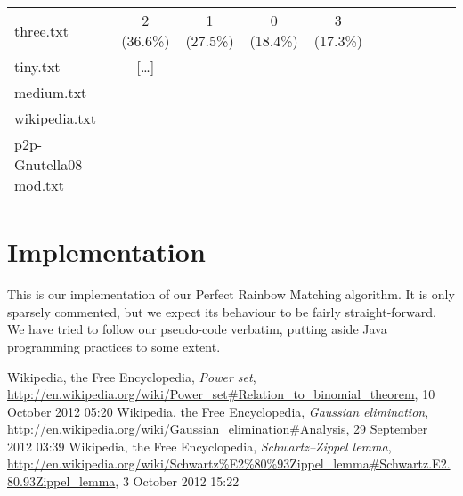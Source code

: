 \documentclass{tufte-handout}
\begin{document}
\medskip
\begin{fullwidth}
\small
\begin{tabular}{lcccccccccc}
three.txt & 2 (36.6\%) & 1 (27.5\%) & 0 (18.4\%) & 3 (17.3\%) \\
tiny.txt & [\ldots] &\\
medium.txt &\\
wikipedia.txt & \\
p2p-Gnutella08-mod.txt &
\end{tabular}
\end{fullwidth}

\appendix

\section{Implementation}
This is our implementation of our Perfect Rainbow Matching algorithm. It is only sparsely commented, but we expect its behaviour to be fairly straight-forward. We have tried to follow our pseudo-code verbatim, putting aside Java programming practices to some extent.

\begin{thebibliography}{9}
 Wikipedia, the Free Encyclopedia, \emph{Power set},  \url{http://en.wikipedia.org/wiki/Power_set#Relation_to_binomial_theorem}, 10 October 2012 05:20
 Wikipedia, the Free Encyclopedia, \emph{Gaussian elimination}, \url{http://en.wikipedia.org/wiki/Gaussian_elimination#Analysis}, 29 September 2012 03:39
 Wikipedia, the Free Encyclopedia, \emph{Schwartz–Zippel lemma}, \url{http://en.wikipedia.org/wiki/Schwartz\%E2\%80\%93Zippel_lemma#Schwartz.E2.80.93Zippel_lemma}, 3 October 2012 15:22
\end{thebibliography}
\end{document}
